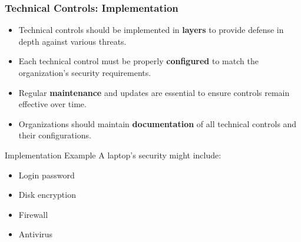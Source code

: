 \documentclass{beamer}
\begin{document}
\begin{frame}
    \frametitle{Technical Controls: Implementation}
    
    \begin{itemize}
        \item Technical controls should be implemented in \textbf{layers} to provide defense in depth against various threats.
        
        \item Each technical control must be properly \textbf{configured} to match the organization's security requirements.
        
        \item Regular \textbf{maintenance} and updates are essential to ensure controls remain effective over time.
        
        \item Organizations should maintain \textbf{documentation} of all technical controls and their configurations.
    \end{itemize}
    
    \begin{exampleblock}{Implementation Example}
        A laptop's security might include:
        \begin{itemize}
            \item Login password
            \item Disk encryption
            \item Firewall
            \item Antivirus
        \end{itemize}
    \end{exampleblock}
\end{frame}
\end{document}
